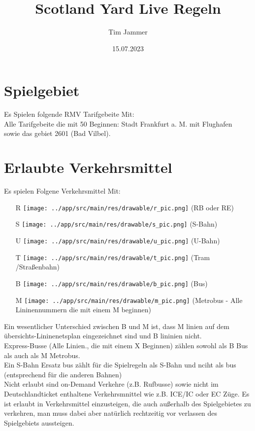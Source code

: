\documentclass[12pt,a4paper]{article}
\title{Scotland Yard Live Regeln}
\author{Tim Jammer}
\date{15.07.2023}
\begin{document}
\maketitle


\section{Spielgebiet}
Es Spielen folgende RMV Tarifgebeite Mit:\\
Alle Tarifgebeite die mit 50 Beginnen: Stadt Frankfurt a. M. mit Flughafen\\
sowie das gebiet 2601 (Bad Vilbel).

\section{Erlaubte Verkehrsmittel}
Es spielen Folgene Verkehrsmittel Mit:
\begin{itemize}
\item[R] {\texttt{[image: ../app/src/main/res/drawable/r\_pic.png]}} (RB oder RE)
\item[S] {\texttt{[image: ../app/src/main/res/drawable/s\_pic.png]}} (S-Bahn)
\item[U] {\texttt{[image: ../app/src/main/res/drawable/u\_pic.png]}} (U-Bahn)
\item[T] {\texttt{[image: ../app/src/main/res/drawable/t\_pic.png]}} (Tram /Straßenbahn)
\item[B] {\texttt{[image: ../app/src/main/res/drawable/b\_pic.png]}} (Bus)
\item[M] {\texttt{[image: ../app/src/main/res/drawable/m\_pic.png]}} (Metrobus - Alle Lininennummern die mit einem M beginnen)
\end{itemize}
Ein wesentlicher Unterschied zwischen B und M ist, dass M linien auf dem übersichts-Lininenetsplan eingezeichnet sind und B lininien nicht.\\
Express-Busse (Alle Linien., die mit einem X Beginnen) zählen sowohl als B Bus als auch als M Metrobus.\\
Ein S-Bahn Ersatz bus zählt für die Spielregeln als S-Bahn und nciht als bus (entsprechend für die anderen Bahnen)
\\
Nicht erlaubt sind on-Demand Verkehre (z.B. Rufbusse) sowie nicht im Deutschlandticket enthaltene Verkehrsmnittel wie z.B. ICE/IC oder EC Züge.
Es ist erlaubt in Verkehrsmittel einzusteigen, die auch außerhalb des Spielgebietes zu verkehren, man muss dabei aber natürlich rechtzeitig vor verlassen des Spielgebiets aussteigen.
\end{document}
